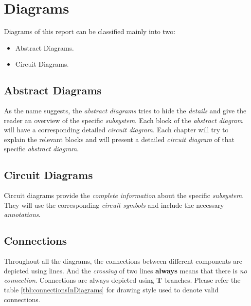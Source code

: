 \documentclass[../../main]{subfiles}
\begin{document}
\section{Diagrams} \label{sec:}

Diagrams of this report can be classified mainly into two:

\begin{itemize}

    \item Abstract Diagrams.
    \item Circuit Diagrams.

\end{itemize}

\subsection{Abstract Diagrams}

As the name suggests, the \emph{abstract diagrams} tries to hide the \emph{details}
and give the reader an overview of the specific \emph{subsystem}. Each block of the
\emph{abstract diagram} will have a corresponding detailed \emph{circuit diagram}.
Each chapter will try to explain the relevant blocks and will present a detailed
\emph{circuit diagram} of that specific \emph{abstract diagram}.

\subsection{Circuit Diagrams}

Circuit diagrams provide the \emph{complete information} about the specific \emph{subsystem}.
They will use the corresponding \emph{circuit symbols} and include the necessary \emph{annotations}.

\subsection{Connections}

Throughout all the diagrams, the connections between different components are depicted using
lines. And the \emph{crossing} of two lines \textbf{always} means that there is \emph{no connection}.
Connections are always depicted using \textbf{T} branches. Please refer the table \ref{tbl:connectionsInDiagrams}
for drawing style used to denote valid connections.

\end{document}
